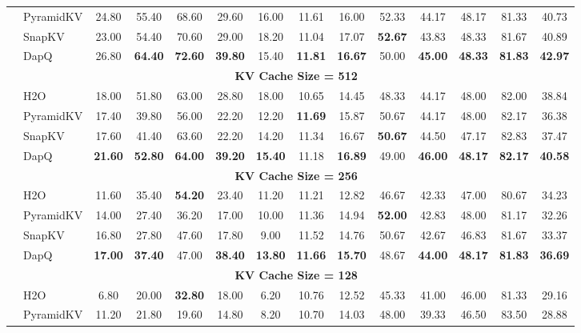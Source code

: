 \begin{table}[!htbp]
{\begin{tabular}{l l *{12}{c}}
& PyramidKV & 24.80 & 55.40 & 68.60 & 29.60 & 16.00 & 11.61 & 16.00 & 52.33 & 44.17 & 48.17 & 81.33 & 40.73 \\
& SnapKV & 23.00 & 54.40 & 70.60 & 29.00 & 18.20 & 11.04 & 17.07 & \textbf{52.67} & 43.83 & 48.33 & 81.67 & 40.89 \\
& DapQ & 26.80 & \textbf{64.40} & \textbf{72.60} & \textbf{39.80} & 15.40 & \textbf{11.81} & \textbf{16.67} & 50.00 & \textbf{45.00} & \textbf{48.33} & \textbf{81.83} & \textbf{42.97} \\
\cmidrule{2-14}
& \multicolumn{13}{c}{\cellcolor{gray!20}\textbf{KV Cache Size = 512}} \\
& H2O & 18.00 & 51.80 & 63.00 & 28.80 & 18.00 & 10.65 & 14.45 & 48.33 & 44.17 & 48.00 & 82.00 & 38.84 \\
& PyramidKV & 17.40 & 39.80 & 56.00 & 22.20 & 12.20 & \textbf{11.69} & 15.87 & 50.67 & 44.17 & 48.00 & 82.17 & 36.38 \\
& SnapKV & 17.60 & 41.40 & 63.60 & 22.20 & 14.20 & 11.34 & 16.67 & \textbf{50.67} & 44.50 & 47.17 & 82.83 & 37.47 \\
& DapQ & \textbf{21.60} & \textbf{52.80} & \textbf{64.00} & \textbf{39.20} & \textbf{15.40} & 11.18 & \textbf{16.89} & 49.00 & \textbf{46.00} & \textbf{48.17} & \textbf{82.17} & \textbf{40.58} \\
\cmidrule{2-14}
& \multicolumn{13}{c}{\cellcolor{gray!20}\textbf{KV Cache Size = 256}} \\
& H2O & 11.60 & 35.40 & \textbf{54.20} & 23.40 & 11.20 & 11.21 & 12.82 & 46.67 & 42.33 & 47.00 & 80.67 & 34.23 \\
& PyramidKV & 14.00 & 27.40 & 36.20 & 17.00 & 10.00 & 11.36 & 14.94 & \textbf{52.00} & 42.83 & 48.00 & 81.17 & 32.26 \\
& SnapKV & 16.80 & 27.80 & 47.60 & 17.80 & 9.00 & 11.52 & 14.76 & 50.67 & 42.67 & 46.83 & 81.67 & 33.37 \\
& DapQ & \textbf{17.00} & \textbf{37.40} & 47.00 & \textbf{38.40} & \textbf{13.80} & \textbf{11.66} & \textbf{15.70} & 48.67 & \textbf{44.00} & \textbf{48.17} & \textbf{81.83} & \textbf{36.69} \\
\cmidrule{2-14}
& \multicolumn{13}{c}{\cellcolor{gray!20}\textbf{KV Cache Size = 128}} \\
& H2O & 6.80 & 20.00 & \textbf{32.80} & 18.00 & 6.20 & 10.76 & 12.52 & 45.33 & 41.00 & 46.00 & 81.33 & 29.16 \\
& PyramidKV & 11.20 & 21.80 & 19.60 & 14.80 & 8.20 & 10.70 & 14.03 & 48.00 & 39.33 & 46.50 & 83.50 & 28.88 \\

\end{tabular}}
\end{table}
